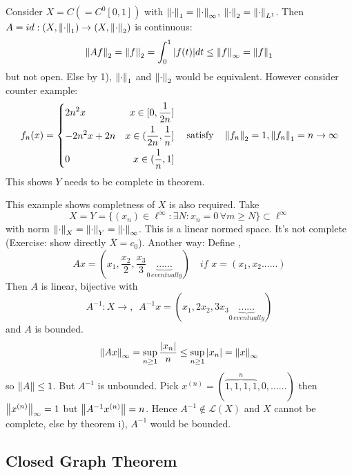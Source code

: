 \begin{example}[Completeness of $Y$]\nl
	Consider $X=C(=C^0[0,1])$ with $\left\|{\cdot}\right\|_1=\left\|{\cdot}\right\|_\infty$, $\left\|{\cdot}\right\|_2=\left\|{\cdot}\right\|_{L^1}$. Then $A=id:(X,\left\|{\cdot}\right\|_1)\to(X,\left\|{\cdot}\right\|_2)$ is continuous:
	$$
		\left\|{Af}\right\|_2
		=\left\|{f}\right\|_2
		=\int_0^1|f(t)|dt
		\leq\left\|{f}\right\|_\infty
		=\left\|{f}\right\|_1
	$$
	but not open. Else by 1),  $\left\|{\cdot}\right\|_1$ and $\left\|{\cdot}\right\|_2$ would be equivalent. However consider counter example:
	\begin{equation}\nonumber
		f_n(x)=\left\{
		\begin{aligned}
			 & {2n^2x}     & x\in[0,\frac{1}{2n}]           \\
			 & {-2n^2x+2n} & x\in(\frac{1}{2n},\frac{1}{n}] \\
			 & 0           & x\in(\frac{1}{n},1]            \\
		\end{aligned}
		\right.\quad\text{satisfy}\quad\left\|{f_n}\right\|_2=1,\left\|{f_n}\right\|_1=n\to\infty
	\end{equation}
	This shows $Y$ needs to be complete in theorem.
\end{example}
\begin{example}[Completeness of $X$]\nl
	This example shows completness of $X$ is also required.
	Take
	$$
		X=Y=\{(x_n)\in\ell^\infty:\exists N:x_n=0\,\forall m\geq N\}\subset\ell^\infty
	$$
	with norm $\left\|{\cdot}\right\|_X=\left\|{\cdot}\right\|_Y=\left\|{\cdot}\right\|_\infty$. This is a linear normed space. It's not complete (Exercise: show directly $\overline{X}=c_0$). Another way:
	Define ,
	$$
		Ax=(x_1,\frac{x_2}{2},\frac{x_3}{3}\underbrace{......}_{0\,eventually})\quad if \,\,x=(x_1,x_2......)
	$$
	Then $A$ is linear, bijective with
	$$
		A^{-1}:X\to ,\,\,\,A^{-1}x=(x_1,2x_2,3x_3\underbrace{......}_{0\,eventually})
	$$
	and $A$ is bounded.
	$$
		\left\|{Ax}\right\|_\infty=\sup_{n\geq1}\frac{|x_n|}{n}\leq\sup_{n\geq1}|x_n|=\left\|{x}\right\|_\infty
	$$
	so $\left\|{A}\right\|\leq1$. But $A^{-1}$ is unbounded.
	Pick $x^{(n)}=(\overbrace{1,1,1,1}^{n},0,......)$ then $\left\|{x^{(n)}}\right\|_\infty=1$ but $\left\|{A^{-1}x^{(n)}}\right\|=n$. Hence $A^{-1}\not\in\mathcal{L}(X)$ and $X$ cannot be complete, else by theorem i), $A^{-1}$ would be bounded.
\end{example}



\subsection{Closed Graph Theorem}


